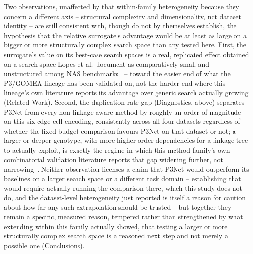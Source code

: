 Two observations, unaffected by that within-family heterogeneity because they concern a different axis --
structural complexity and dimensionality, not dataset identity -- are still consistent with, though do not
by themselves establish, the hypothesis that the relative surrogate's advantage would be at least as large
on a bigger or more structurally complex search space than any tested here. First, the surrogate's value on
its best-case search spaces is a real, replicated effect obtained on a search space Lopes et al.\ document as
comparatively small and unstructured among NAS benchmarks~\citep{lopes2023nasbenchdesign} -- toward the
easier end of what the P3/GOMEA lineage has been validated on, not the harder end where this lineage's own
literature reports its advantage over generic search actually growing (Related Work). Second, the
duplication-rate gap (Diagnostics, above) separates P3Net from every non-linkage-aware method by roughly an
order of magnitude on this six-edge cell encoding, consistently across all four datasets regardless of
whether the fixed-budget comparison favours P3Net on that dataset or not; a larger or deeper genotype, with
more higher-order dependencies for a linkage tree to actually exploit, is exactly the regime in which this
method family's own combinatorial validation literature reports that gap widening further, not
narrowing~\citep{goldman2015fast,qiao2024gomearuntime,dushatskiy2019csgomea}. Neither observation licenses a
claim that P3Net would outperform its baselines on a larger search space or a different task domain --
establishing that would require actually running the comparison there, which this study does not do, and the
dataset-level heterogeneity just reported is itself a reason for caution about how far any such extrapolation
should be trusted -- but together they remain a specific, measured reason, tempered rather than strengthened
by what extending within this family actually showed, that testing a larger or more structurally complex
search space is a reasoned next step and not merely a possible one (Conclusions).

